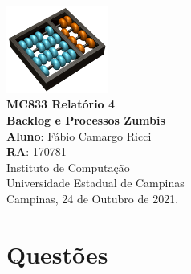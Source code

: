 \documentclass[12pt,a4paper]{report}
\begin{document}
\begin{titlepage}
    \begin{center}
        \vspace*{1cm}
        \includegraphics[width=0.25\textwidth]{Logo}\\
        \vspace{1.5cm}
        \Huge
    	\textbf{MC833 Relatório 4 \\
        Backlog e Processos Zumbis} \\
        \vspace{1.5cm}
        \Large
        \textbf{Aluno}: Fábio Camargo Ricci\\
        \textbf{RA}: 170781\\
        \vspace{1.2cm}
    	\Large 
    	Instituto de Computação\\
    	Universidade Estadual de Campinas\\
    	\vspace{1.5cm}
        Campinas, 24 de Outubro de 2021.
    \end{center}
\end{titlepage}
\tableofcontents
\clearpage

\newcommand{\shellcmd}[1]{\texttt{\footnotesize\# #1}}%

\section{Questões}
\end{document}
